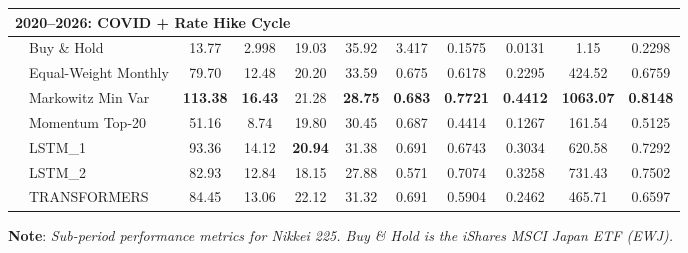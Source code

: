 \documentclass[]{elsarticle}
\begin{document}
\begin{table}[H]
{\begin{tabular}{llccccccccc}
\multicolumn{11}{l}{\textbf{2020--2026: COVID + Rate Hike Cycle}} \\
\midrule
& Buy \& Hold          & 13.77  & 2.998 & 19.03 & 35.92 & 3.417 & 0.1575  & 0.0131   & 1.15      & 0.2298 \\
& Equal-Weight Monthly & 79.70  & 12.48 & 20.20 & 33.59 & 0.675 & 0.6178  & 0.2295  & 424.52    & 0.6759 \\
& Markowitz Min Var    & \textbf{113.38} & \textbf{16.43} & 21.28 & \textbf{28.75} & \textbf{0.683} & \textbf{0.7721}  & \textbf{0.4412}  & \textbf{1063.07}  & \textbf{0.8148} \\
& Momentum Top-20      & 51.16  & 8.74  & 19.80 & 30.45 & 0.687 & 0.4414  & 0.1267  & 161.54    & 0.5125 \\
& LSTM\_1              & 93.36  & 14.12 & \textbf{20.94} & 31.38 & 0.691 & 0.6743  & 0.3034  & 620.58    & 0.7292 \\
& LSTM\_2              & 82.93  & 12.84 & 18.15 & 27.88 & 0.571 & 0.7074  & 0.3258  & 731.43    & 0.7502 \\
& TRANSFORMERS         & 84.45  & 13.06 & 22.12 & 31.32 & 0.691 & 0.5904  & 0.2462  & 465.71    & 0.6597 \\

\bottomrule
\end{tabular}}
\end{table}
\vspace{-0.4cm}
\noindent\linespread{0.65}\selectfont
{\scriptsize \textbf{Note}: \textit{Sub-period performance metrics for Nikkei 225. Buy \& Hold is the iShares MSCI Japan ETF (EWJ).}}

\linespread{1.5}\selectfont
\end{document}
